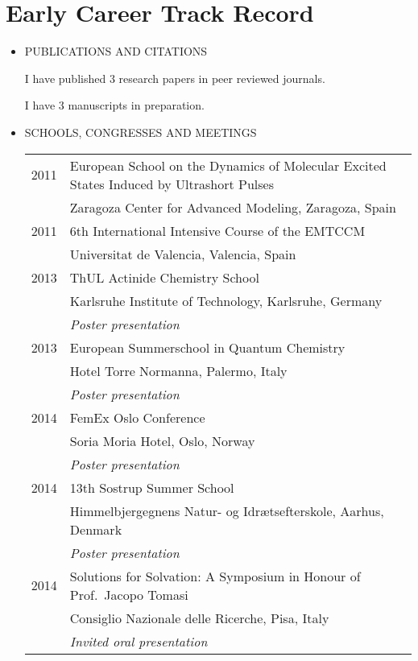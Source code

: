 \documentclass[notitlepage,a4paper,12pt]{article}
\begin{document}
\pagebreak

\section*{Early Career Track Record}

\begin{itemize}

\item PUBLICATIONS AND CITATIONS

I have published 3 research papers in peer reviewed journals.
\begin{refsection}
\nocite{*}
\printbibliography[heading=none]
\end{refsection}

I have 3 manuscripts in preparation.
\begin{refsection}
\nocite{*}
\printbibliography[heading=none]
\end{refsection}

\item SCHOOLS, CONGRESSES AND MEETINGS

  \begin{tabular}{ll}
 2011 & European School on the Dynamics of Molecular Excited States Induced by Ultrashort Pulses \\
      & Zaragoza Center for Advanced Modeling, Zaragoza, Spain \\
 2011 & 6th International Intensive Course of the EMTCCM \\
      & Universitat de Valencia, Valencia, Spain \\
 2013 & ThUL Actinide Chemistry School \\
      & Karlsruhe Institute of Technology, Karlsruhe, Germany \\
      & \emph{Poster presentation} \\
 2013 & European Summerschool in Quantum Chemistry \\
      & Hotel Torre Normanna, Palermo, Italy \\
      & \emph{Poster presentation} \\
 2014 & FemEx Oslo Conference \\
      & Soria Moria Hotel, Oslo, Norway \\ %
      & \emph{Poster presentation} \\
 2014 & 13th Sostrup Summer School \\
      & Himmelbjergegnens Natur- og Idrætsefterskole, Aarhus, Denmark \\ %
      & \emph{Poster presentation} \\
 2014 & Solutions for Solvation: A Symposium in Honour of Prof.~Jacopo Tomasi \\
      & Consiglio Nazionale delle Ricerche, Pisa, Italy \\ %
      & \emph{Invited oral presentation}
  \end{tabular}


\end{itemize}
\end{document}
